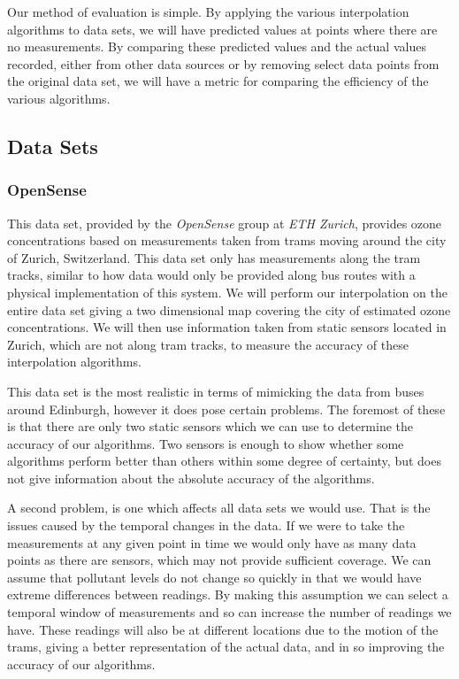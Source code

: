 		Our method of evaluation is simple. By applying the various interpolation algorithms to data sets, we will have predicted values at points where there are no measurements. By comparing these predicted values and the actual values recorded, either from other data sources or by removing select data points from the original data set, we will have a metric for comparing the efficiency of the various algorithms. 

		\subsection{Data Sets}\label{prediction_evaluation_methodology_data_sets}

			\subsubsection{OpenSense}\label{prediction_evaluation_methodology_data_sets_opensense}

				This data set, provided by the \emph{OpenSense} group at \emph{ETH Zurich}, provides ozone concentrations based on measurements taken from trams moving around the city of Zurich, Switzerland. This data set only has measurements along the tram tracks, similar to how data would only be provided along bus routes with a physical implementation of this system. We will perform our interpolation on the entire data set giving a two dimensional map covering the city of estimated ozone concentrations. We will then use information taken from static sensors located in Zurich, which are not along tram tracks, to measure the accuracy of these interpolation algorithms. 


				This data set is the most realistic in terms of mimicking the data from buses around Edinburgh, however it does pose certain problems. The foremost of these is that there are only two static sensors which we can use to determine the accuracy of our algorithms. Two sensors is enough to show whether some algorithms perform better than others within some degree of certainty, but does not give information about the absolute accuracy of the algorithms. 

				A second problem, is one which affects all data sets we would use. That is the issues caused by the temporal changes in the data. If we were to take the measurements at any given point in time we would only have as many data points as there are sensors, which may not provide sufficient coverage. We can assume that pollutant levels do not change so quickly in that we would have extreme differences between readings. By making this assumption we can select a temporal window of measurements and so can increase the number of readings we have. These readings will also be at different locations due to the motion of the trams, giving a better representation of the actual data, and in so improving the accuracy of our algorithms. 


